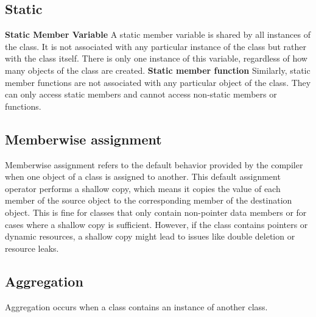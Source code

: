 \documentclass{report}
\begin{document}
    \pagebreak
    \subsection{Static}
    \bigbreak \noindent 
    \begin{concept}
        \bigbreak \noindent 
        \textbf{Static Member Variable}
        \bigbreak \noindent 
       A static member variable is shared by all instances of the class. It is not associated with any particular instance of the class but rather with the class itself. There is only one instance of this variable, regardless of how many objects of the class are created. 
       \bigbreak \noindent 
       \textbf{Static member function}
       \bigbreak \noindent 
       Similarly, static member functions are not associated with any particular object of the class. They can only access static members and cannot access non-static members or functions.
    \end{concept}
    

    \bigbreak \noindent 
    \subsection{Memberwise assignment}
    \bigbreak \noindent 
    \begin{concept}
        Memberwise assignment refers to the default behavior provided by the compiler when one object of a class is assigned to another. This default assignment operator performs a shallow copy, which means it copies the value of each member of the source object to the corresponding member of the destination object. This is fine for classes that only contain non-pointer data members or for cases where a shallow copy is sufficient. However, if the class contains pointers or dynamic resources, a shallow copy might lead to issues like double deletion or resource leaks.
    \end{concept}


    \bigbreak \noindent 
    \subsection{Aggregation}
    \bigbreak \noindent 
    \begin{concept}
       Aggregation occurs when a class contains an instance of another class. 
    \end{concept}
    

    \pagebreak
    \bigbreak \noindent 
\end{document}
